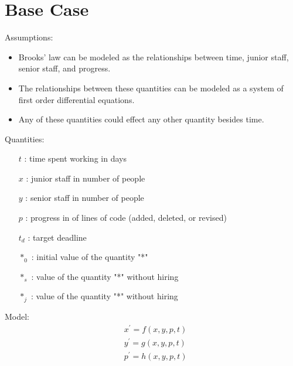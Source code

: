 \documentclass{article}
\newenvironment{atomize}
    {\begin{list} {} {
            \setlength\itemindent{0pt}
            \setlength\leftmargin{10pt}
            \setlength\labelwidth{0pt}
    }}
    {\end{list}}
\begin{document}
\section*{Base Case}
  \begin{atomize}
    \item Assumptions:
      \begin{itemize}
        \item Brooks' law can be modeled as the relationships between
        time, junior staff, senior staff, and progress.
        \item The relationships between these quantities can be modeled
        as a system of first order differential equations.
        \item Any of these quantities could effect any other quantity besides
        time.  
        \end{itemize}

    \item Quantities:
      \begin{itemize}
        \item [$t$]: time spent working in days
        \item [$x$]: junior staff in number of people
        \item [$y$]: senior staff in number of people
        \item [$p$]: progress in of lines of code (added, deleted, or revised)
        \item [$t_{d}$]: target deadline
        \item [$*_{0}$]: initial value of the quantity "*"
        \item [$*_{s}$]: value of the quantity "*" without hiring
        \item [$*_{j}$]: value of the quantity "*" without hiring
      \end{itemize}
  
    \item Model:
      \begin{align*}
        &x^{\prime} = f\left(x, y, p, t\right) \\[6pt]
        &y^{\prime} = g\left(x, y, p, t\right) \\[6pt]
        &p^{\prime} = h\left(x, y, p, t\right)
      \end{align*}
  \end{atomize}
\end{document}
